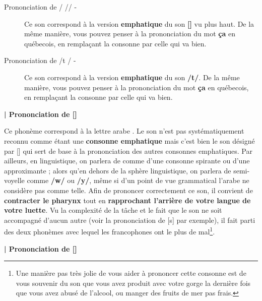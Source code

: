 \begin{description}
    \item[Prononciation de / /\dh \super \textrevglotstop/ -]

    Ce son correspond à la version \textbf{emphatique} du son \textbf{[\dh]} vu plus haut. De la même manière, vous pouvez penser à la prononciation du mot \textbf{ça} en québecois, en remplaçant la consonne par celle qui va bien.

    \item[Prononciation de  /t \super \textrevglotstop/ -]

    Ce son correspond à la version \textbf{emphatique} du son \textbf{/t/}. De la même manière, vous pouvez penser à la prononciation du mot \textbf{ça} en québecois, en remplaçant la consonne par celle qui va bien.


\end{description}




\textbf{| Prononciation de  [\textrevglotstop]}

Ce phonème correspond à la lettre arabe . Le son n'est pas systématiquement reconnu comme étant une \textbf{consonne emphatique} mais c'est bien le son désigné par  [\textrevglotstop] qui sert de base à la prononciation des autres consonnes emphatiques. Par ailleurs, en linguistique, on parlera de  comme d'une consonne spirante ou d'une approximante ;  alors qu'en dehors de la sphère linguistique, on parlera de semi-voyelle comme \textbf{/w/} ou \textbf{/y/}, même si d'un point de vue grammatical l'arabe ne considère pas  comme telle. Afin de prononcer correctement ce son, il convient de \textbf{contracter le pharynx} tout en \textbf{rapprochant l'arrière de votre langue de votre luette}. Vu la complexité de la tâche et le fait que le son ne soit accompagné d'aucun autre (voir la prononciation de  [s\super \textrevglotstop] par exemple), il fait parti des deux phonèmes avec lequel les francophones ont le plus de mal\footnote{Une manière pas très jolie de vous aider à prononcer cette consonne est de vous souvenir du son que vous avez produit avec votre gorge la dernière fois que vous avez abusé de l'alcool, ou manger des fruits de mer pas frais.}.


\textbf{| Prononciation de  [\textinvscr]}

